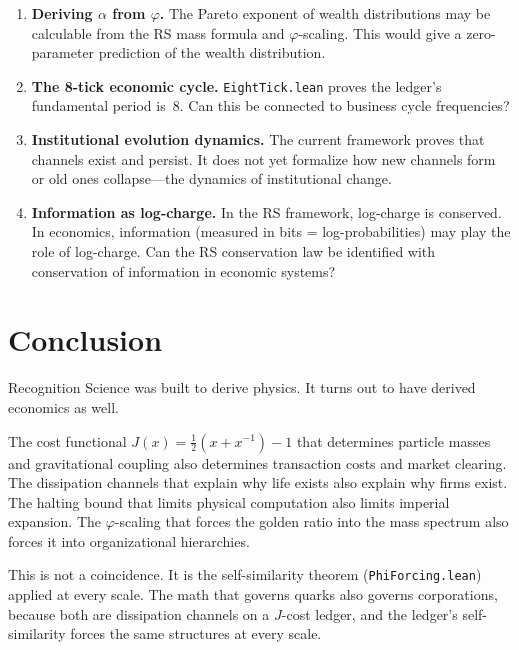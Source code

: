 \documentclass[11pt,a4paper]{article}
\theoremstyle{plain}
\theoremstyle{definition}
\theoremstyle{remark}
\newcommand{\Jcost}{J}
\begin{document}
\begin{enumerate}[nosep]
\item \textbf{Deriving $\alpha$ from $\varphi$.}
The Pareto exponent of wealth distributions may be calculable from the RS mass formula and $\varphi$-scaling.
This would give a zero-parameter prediction of the wealth distribution.

\item \textbf{The 8-tick economic cycle.}
\texttt{EightTick.lean} proves the ledger's fundamental period is~8.
Can this be connected to business cycle frequencies?

\item \textbf{Institutional evolution dynamics.}
The current framework proves that channels exist and persist.
It does not yet formalize how new channels form or old ones collapse---the dynamics of institutional change.

\item \textbf{Information as log-charge.}
In the RS framework, log-charge is conserved.
In economics, information (measured in bits = log-probabilities) may play the role of log-charge.
Can the RS conservation law be identified with conservation of information in economic systems?
\end{enumerate}

\section{Conclusion}\label{sec:conclusion}

Recognition Science was built to derive physics.
It turns out to have derived economics as well.

The cost functional $\Jcost(x) = \tfrac{1}{2}(x + x^{-1}) - 1$ that determines particle masses and gravitational coupling also determines transaction costs and market clearing.
The dissipation channels that explain why life exists also explain why firms exist.
The halting bound that limits physical computation also limits imperial expansion.
The $\varphi$-scaling that forces the golden ratio into the mass spectrum also forces it into organizational hierarchies.

This is not a coincidence.
It is the self-similarity theorem (\texttt{PhiForcing.lean}) applied at every scale.
The math that governs quarks also governs corporations, because both are dissipation channels on a $\Jcost$-cost ledger, and the ledger's self-similarity forces the same structures at every scale.
\end{document}
